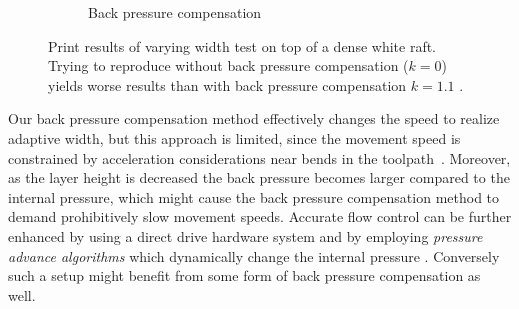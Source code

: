 {\begin{figure}
\begin{subfigure}[t]{\figwidth}
\caption{Back pressure compensation}\label{back_pressure}
\end{subfigure}
\caption{
Print results of varying width test on top of a dense white raft.
Trying to reproduce  without back pressure compensation ($k=0$) yields worse results  than with back pressure compensation $k=1.1$ .
}
\label{back_pressure_compensation}
\end{figure}


Our back pressure compensation method effectively changes the speed to realize adaptive width,
but this approach is limited, since the movement speed is constrained by acceleration considerations near bends in the toolpath~\cite{Ertay2018}.
Moreover, as the layer height is decreased the back pressure becomes larger compared to the internal pressure, which might cause the back pressure compensation method to demand prohibitively slow movement speeds.
%
Accurate flow control can be further enhanced by using a direct drive hardware system and by employing \emph{pressure advance algorithms} which dynamically change the internal pressure \cite{tronvoll2019investigating}.
Conversely such a setup might benefit from some form of back pressure compensation as well.


}

